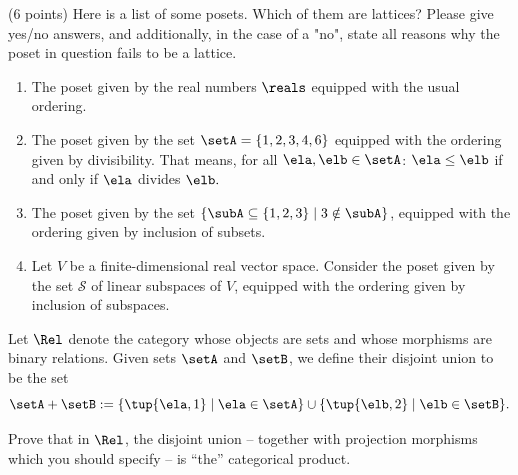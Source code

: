 \documentclass[paper=8.125in:10.250in,pagesize=pdftex,
    headinclude=false,footinclude=false,oneside,egregdoesnotlikesansseriftitles]{kaobook}
\begin{document}
\begin{gradedexercise}\label{ex:LatticeCheck}
(6 points) Here is a list of some posets. Which of them are lattices? 
Please give yes/no answers, and additionally, in the case of a "no", state all reasons why the poset in question fails to be a lattice. 
\begin{enumerate}
\item The poset given by the real numbers $\reals$ equipped with the usual ordering. 
\item The poset given by the set $\setA = \{ 1, 2, 3, 4, 6\}$ equipped with the ordering given by divisibility. That means, for all $\ela, \elb \in \setA$: $\ela \leq \elb$ if and only if $\ela$ divides $\elb.$ 
\item The poset given by the set $\{ \subA \subseteq \{1, 2 , 3 \} \mid 3 \notin \subA \}$, equipped with the ordering given by inclusion of subsets. 
\item Let $V$ be a finite-dimensional real vector space. Consider the poset given by the set $\mathcal{S}$ of linear subspaces of $V$, equipped with the ordering given by inclusion of subspaces. 
\end{enumerate}
\end{gradedexercise}


\newpage


\begin{gradedexercise}\label{ex:DirectSumProd}
Let $\Rel$ denote the category whose objects are sets and whose morphisms are binary relations. Given sets $\setA$ and $\setB$, we define their disjoint union to be the set
$$
\setA + \setB := \{ \tup{\ela, 1} \mid \ela \in \setA \} \cup \{ \tup{\elb, 2} \mid \elb \in \setB \}.
$$

Prove that in $\Rel$, the disjoint union -- together with projection morphisms which you should specify -- is ``the'' categorical product. 
\end{gradedexercise}


\newpage
\end{document}

